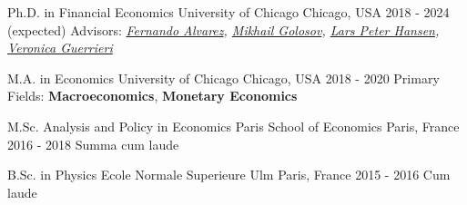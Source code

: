

\begin{cventries}

    \cventry
    {Ph.D. in Financial Economics} %
    {University of Chicago} %
    {Chicago, USA} %
    {2018 - 2024 (expected)} %
    {Advisors: \textit{\href{https://alvarezfernando.com/}{Fernando Alvarez}, \href{https://voices.uchicago.edu/golosov/contact/}{Mikhail Golosov}, \href{https://larspeterhansen.org/contact/}{Lars Peter Hansen}, \href{https://voices.uchicago.edu/veronicaguerrieri/contact/}{Veronica Guerrieri}}}

    \cventry
    {M.A. in Economics} %
    {University of Chicago} %
    {Chicago, USA} %
    {2018 - 2020} %
    {Primary Fields:
        \textbf{Macroeconomics}, \textbf{Monetary Economics}
    }

    \cventry
    {M.Sc. Analysis and Policy in Economics} %
    {Paris School of Economics} %
    {Paris, France} %
    {2016 - 2018} %
    {Summa cum laude}

    \cventry
    {B.Sc. in Physics} %
    {Ecole Normale Superieure Ulm} %
    {Paris, France} %
    {2015 - 2016} %
    {Cum laude}

\end{cventries}
